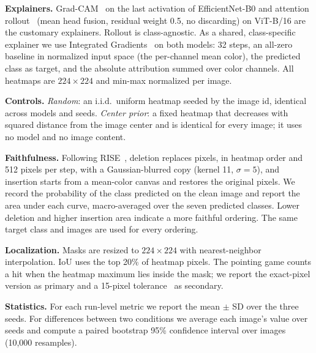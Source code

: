 \textbf{Explainers.} Grad-CAM~\cite{selvaraju2017gradcam} on the last activation of EfficientNet-B0 and
attention rollout~\cite{abnar2020attention} (mean head fusion, residual weight 0.5, no discarding) on
ViT-B/16 are the customary explainers. Rollout is class-agnostic. As a shared, class-specific explainer we
use Integrated Gradients~\cite{sundararajan2017axiomatic} on both models: 32 steps, an all-zero baseline in
normalized input space (the per-channel mean color), the predicted class as target, and the absolute
attribution summed over color channels. All heatmaps are $224\times224$ and min-max normalized per image.

\textbf{Controls.} \emph{Random}: an i.i.d.\ uniform heatmap seeded by the image id, identical across models
and seeds. \emph{Center prior}: a fixed heatmap that decreases with squared distance from the image center
and is identical for every image; it uses no model and no image content.

\textbf{Faithfulness.} Following RISE~\cite{petsiuk2018rise}, deletion replaces pixels, in heatmap order
and 512 pixels per step, with a Gaussian-blurred copy (kernel 11, $\sigma=5$), and insertion starts from a
mean-color canvas and restores the original pixels. We record the probability of the class predicted on
the clean image and report the area under each curve, macro-averaged over the seven predicted classes.
Lower deletion and higher insertion area indicate a more faithful ordering. The same target class and
images are used for every ordering.

\textbf{Localization.} Masks are resized to $224\times224$ with nearest-neighbor interpolation. IoU uses the
top 20\% of heatmap pixels. The pointing game counts a hit when the heatmap maximum lies inside the mask;
we report the exact-pixel version as primary and a 15-pixel tolerance~\cite{zhang2016topdown} as
secondary.

\textbf{Statistics.} For each run-level metric we report the mean $\pm$ SD over the three seeds. For
differences between two conditions we average each image's value over seeds and compute a paired
bootstrap 95\% confidence interval over images (10,000 resamples).
